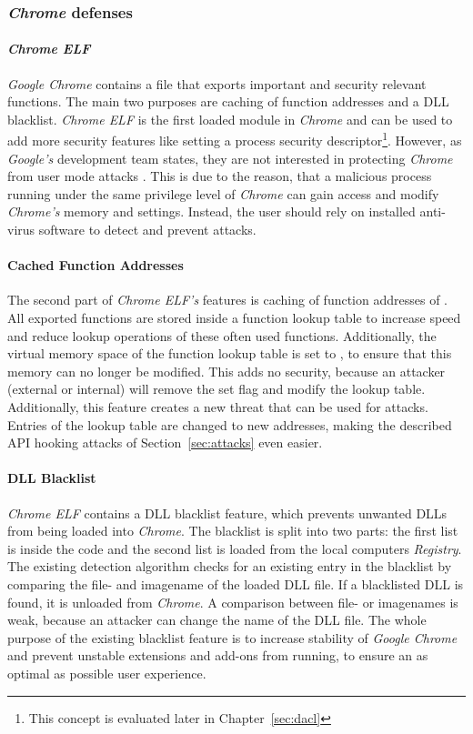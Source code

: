 \subsubsection{\emph{Chrome} defenses}
\paragraph{\emph{Chrome ELF}}
\emph{Google Chrome} contains a  file that exports important and security relevant functions. The main two purposes are caching of function addresses and a \gls{DLL} blacklist. \emph{Chrome ELF} is the first loaded module in \emph{Chrome} and can be used to add more security features like setting a process security descriptor\footnote{This concept is evaluated later in Chapter~\ref{sec:dacl}}. However, as \emph{Google's} development team states, they are not interested in protecting \emph{Chrome} from user mode attacks \cite{chromium_security}. This is due to the reason, that a malicious process running under the same privilege level of \emph{Chrome} can gain access and modify \emph{Chrome's} memory and settings. Instead, the user should rely on installed anti-virus software to detect and prevent attacks.

\paragraph{Cached Function Addresses}
The second part of \emph{Chrome ELF's} features is caching of function addresses of . All exported functions are stored inside a function lookup table to increase speed and reduce lookup operations of these often used functions. Additionally, the virtual memory space of the function lookup table is set to , to ensure that this memory can no longer be modified. This adds no security, because an attacker (external or internal) will remove the set  flag and modify the lookup table. Additionally, this feature creates a new threat that can be used for attacks. Entries of the lookup table are changed to new addresses, making the described \gls{API} hooking attacks of Section~\ref{sec:attacks} even easier.

\paragraph{DLL Blacklist}
\emph{Chrome ELF} contains a \gls{DLL} blacklist feature, which prevents unwanted \glspl{DLL} from being loaded into \emph{Chrome}. The blacklist is split into two parts: the first list is inside the code and the second list is loaded from the local computers \emph{Registry}. The existing detection algorithm checks for an existing entry in the blacklist by comparing the file- and imagename of the loaded \gls{DLL} file. If a blacklisted \gls{DLL} is found, it is unloaded from \emph{Chrome}. A comparison between file- or imagenames is weak, because an attacker can change the name of the \gls{DLL} file. The whole purpose of the existing blacklist feature is to increase stability of \emph{Google Chrome} and prevent unstable extensions and add-ons from running, to ensure an as optimal as possible user experience.